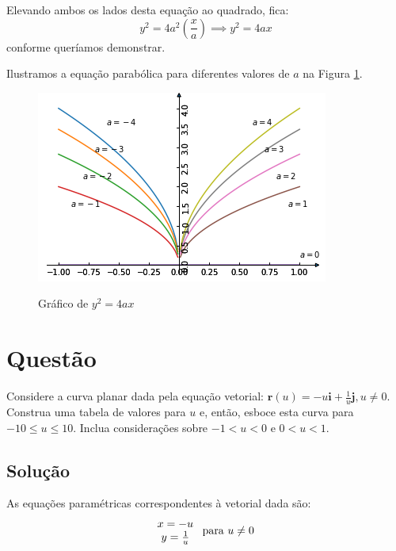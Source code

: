 \documentclass[a4paper,11pt,pagenumber=true]{article}
\theoremstyle{mytheor}
\begin{document}
            Elevando ambos os lados desta equação ao quadrado, fica:
            \[
                y^2 = 4a^2\left(\frac{x}{a}\right) \implies
                y^2 = 4ax
            \] conforme queríamos demonstrar. 
            
            Ilustramos a equação parabólica para diferentes valores de $a$ na Figura \ref{fig:q1}.

            \begin{figure}[h]
            \centering
            \includegraphics[width=.9\textwidth]{images/q-1.png}
                \label{fig:q1}
                \caption{Gráfico de $y^2 = 4ax$}
            \end{figure}

    \section{Questão }
    
        Considere a curva planar dada pela equação vetorial: $\mathbf{r}(u) = -u \mathbf{i} + \frac{1}{u} \mathbf{j}, u \neq 0$. Construa uma tabela de valores para $u$ e, então, esboce esta curva para $-10 \leq u \leq 10$. Inclua considerações sobre $-1 < u < 0$ e $0 < u < 1$. 
    
        \subsection*{Solução}
            
            As equações paramétricas correspondentes à vetorial dada são: 
            \begin{equation*}
                \begin{matrix}
                    x = -u \\
                    y = \frac{1}{u}
                \end{matrix} \\
                \text{ para } u \neq 0
            \end{equation*}
            
\end{document}
